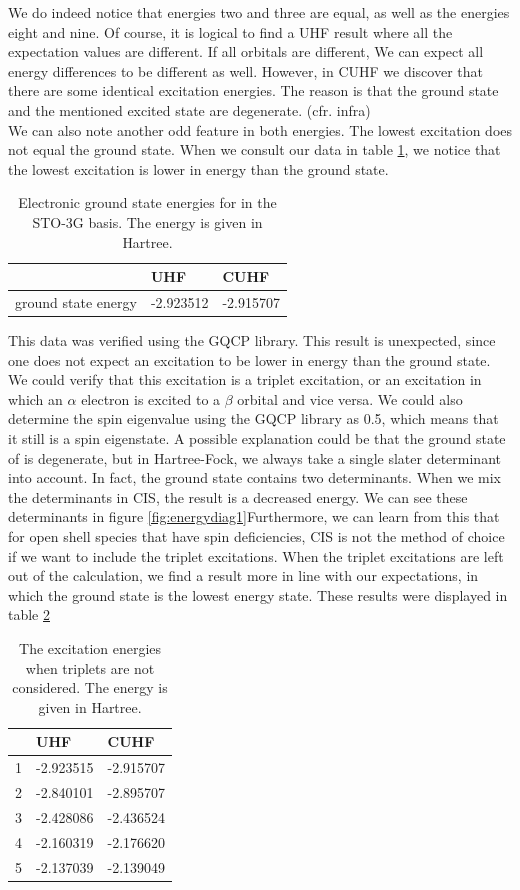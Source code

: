 \documentclass[twoside,twocolumn,9pt]{article}
\begin{document}
We do indeed notice that energies two and three are equal, as well as the energies eight and nine. Of course, it is logical to find a UHF result where all the expectation values are
different. If all orbitals are different, We can expect all energy differences to be different as well. However, in CUHF we discover that there are some identical
excitation energies. The reason is that the ground state and the mentioned excited state are degenerate. (cfr. infra)\\
We can also note another odd feature in both energies. The lowest excitation does not equal the ground state. When we consult our data in table
\ref{tab:ground states}, we notice that the lowest excitation is lower in energy than the ground state.
\begin{table}[h]
  \caption{Electronic ground state energies for  in the STO-3G basis. The energy is given in Hartree.}
  \label{tab:ground states}
  \begin{tabular}{l|l|l}
                        & UHF       & CUHF      \\
    \hline
    ground state energy & -2.923512 & -2.915707
  \end{tabular}
\end{table}
This data was verified using the GQCP library. This result is unexpected, since one does not expect an excitation to be lower in energy than the ground state. We could verify that
this excitation is a triplet excitation, or an excitation in which an $\alpha$ electron is excited to a $\beta$ orbital and vice versa. We could also determine the spin eigenvalue using
the GQCP library as 0.5, which means that it still is a spin eigenstate. A possible explanation could be that the ground state of  is degenerate, but in Hartree-Fock, we always 
take a single slater determinant into account. In fact, the ground state contains two determinants. When we mix the determinants in CIS, the result is a decreased energy.  
We can see these determinants in figure \ref{fig:energydiag1}Furthermore, we can learn from this that for open shell species that have spin
deficiencies, CIS is not the method of choice if we want to include the triplet excitations. When the triplet excitations are left out of the calculation, we find a result more
in line with our expectations, in which the ground state is the lowest energy state. These results were displayed in table \ref{tab:excits_no_triplets}\\
\begin{table}[h]
  \caption{The excitation energies when triplets are not considered. The energy is given in Hartree.}
  \label{tab:excits_no_triplets}
  \begin{tabular}{l|l|l}
      & UHF       & CUHF      \\
    \hline
    1 & -2.923515 & -2.915707 \\
    2 & -2.840101 & -2.895707 \\
    3 & -2.428086 & -2.436524 \\
    4 & -2.160319 & -2.176620 \\
    5 & -2.137039 & -2.139049
  \end{tabular}
\end{table}
\end{document}
